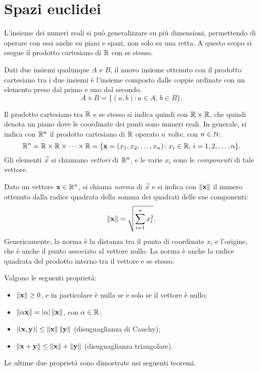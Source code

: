 \section{Spazi euclidei}
L'insieme dei numeri reali si può generalizzare su più dimensioni, permettendo di operare con essi anche su piani e spazi, non solo su una retta. A questo scopo si esegue il prodotto cartesiano di $\mathbb{R}$ con se stesso.
\begin{definizione}
Dati due insiemi qualunque $A$ e $B$, il nuovo insieme ottenuto con il prodotto cartesiano tra i due insiemi è l'insieme composto dalle coppie ordinate con un elemento preso dal primo e uno dal secondo.
\[
A\times B=\{(a,b)\colon a\in A,\,b\in B\}.
\]
\end{definizione}
Il prodotto cartesiano tra $\mathbb{R}$ e se stesso si indica quindi con $\mathbb{R}\times\mathbb{R}$, che quindi denota un piano dove le coordinate dei punti sono numeri reali.
In generale, si indica con $\mathbb{R}^n$ il prodotto cartesiano di $\mathbb{R}$ operato $n$ volte, con $n\in\mathbb{N}$:
\[
\mathbb{R}^n=\mathbb{R}\times\mathbb{R}\times\dots\times\mathbb{R}=\{\mathbf{x}=(x_1,x_2,\dots,x_n)\colon x_i\in\mathbb{R},\,i=1,2,\dots,n\}.
\]
Gli elementi $\vec x$ si chiamano \emph{vettori} di $\mathbb{R}^n$, e le varie $x_i$ sono le \emph{componenti} di tale vettore.
\begin{definizione}
\label{d:norma}
Dato un vettore $\mathbf{x}\in\mathbb{R}^n$, si chiama \emph{norma} di $\vec x$ e si indica con $\left\|{\mathbf{x}}\right\|$ il numero ottenuto dalla radice quadrata della somma dei quadrati delle sue componenti:
\begin{equation}
\label{eq:norma}
\left\|{\mathbf{x}}\right\|=\sqrt{\sum_{i=1}^nx_i^2}.
\end{equation}
Genericamente, la norma è la distanza tra il punto di coordinate $x_i$ e l'origine, che è anche il punto associato al vettore nullo.
La norma è anche la radice quadrata del prodotto interno tra il vettore e se stesso.
\end{definizione}
Valgono le seguenti proprietà:
\begin{itemize}
\item $\left\|{\mathbf{x}}\right\|\geq 0$, e in particolare è nulla se e solo se il vettore è nullo;
\item $\left\|{\alpha\mathbf{x}}\right\|=|\alpha|\left\|{\mathbf{x}}\right\|$, con $\alpha\in\mathbb{R}$;
\item $|(\mathbf{x},\mathbf{y})|\leq\left\|{\mathbf{x}}\right\|\left\|{\mathbf{y}}\right\|$ (disuguaglianza di Cauchy);
\item $\left\|{\mathbf{x}+\mathbf{y}}\right\|\leq\left\|{\mathbf{x}}\right\|+\left\|{\mathbf{y}}\right\|$ (disuguaglianza triangolare).
\end{itemize}
Le ultime due proprietà sono dimostrate nei seguenti teoremi.
